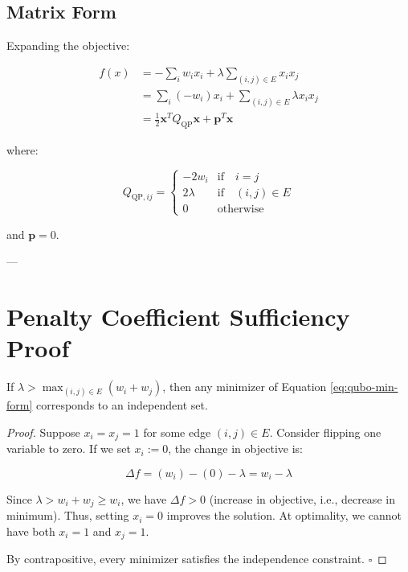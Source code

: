 \subsection{Matrix Form}

Expanding the objective:

\begin{align}
f(x) &= -\sum_{i} w_i x_i + \lambda \sum_{(i,j) \in E} x_i x_j \\
&= \sum_{i} (-w_i) x_i + \sum_{(i,j) \in E} \lambda x_i x_j \\
&= \frac{1}{2} \mathbf{x}^T Q_{\text{QP}} \mathbf{x} + \mathbf{p}^T \mathbf{x}
\end{align}

where:

\begin{equation}
Q_{\text{QP},ij} = \begin{cases}
-2w_i & \text{if} \quad i = j \\
2\lambda & \text{if} \quad (i,j) \in E \\
0 & \text{otherwise}
\end{cases}
\end{equation}

and $\mathbf{p} = 0$.

---

\section{Penalty Coefficient Sufficiency Proof}

\begin{theorem}
If $\lambda > \max_{(i,j) \in E} (w_i + w_j)$, then any minimizer of Equation \eqref{eq:qubo-min-form} corresponds to an independent set.
\end{theorem}

\begin{proof}
Suppose $x_i = x_j = 1$ for some edge $(i,j) \in E$. Consider flipping one variable to zero. If we set $x_i := 0$, the change in objective is:

\begin{equation}
\Delta f = (w_i) - (0) - \lambda = w_i - \lambda
\end{equation}

Since $\lambda > w_i + w_j \geq w_i$, we have $\Delta f > 0$ (increase in objective, i.e., decrease in minimum). Thus, setting $x_i = 0$ improves the solution. At optimality, we cannot have both $x_i = 1$ and $x_j = 1$.

By contrapositive, every minimizer satisfies the independence constraint. $\square$
\end{proof}

